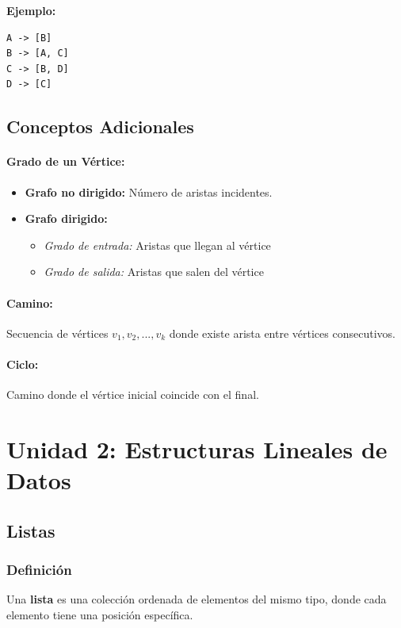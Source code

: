 \documentclass[12pt,a4paper]{article}
\begin{document}
\textbf{Ejemplo:}
\begin{verbatim}
A -> [B]
B -> [A, C]
C -> [B, D]
D -> [C]
\end{verbatim}

\subsection{Conceptos Adicionales}

\paragraph{Grado de un Vértice:}
\begin{itemize}
    \item \textbf{Grafo no dirigido:} Número de aristas incidentes.
    \item \textbf{Grafo dirigido:} 
    \begin{itemize}
        \item \textit{Grado de entrada:} Aristas que llegan al vértice
        \item \textit{Grado de salida:} Aristas que salen del vértice
    \end{itemize}
\end{itemize}

\paragraph{Camino:} Secuencia de vértices $v_1, v_2, ..., v_k$ donde existe arista entre vértices consecutivos.

\paragraph{Ciclo:} Camino donde el vértice inicial coincide con el final.

\newpage

\section{Unidad 2: Estructuras Lineales de Datos}

\subsection{Listas}

\subsubsection{Definición}
Una \textbf{lista} es una colección ordenada de elementos del mismo tipo, donde cada elemento tiene una posición específica.
\end{document}
